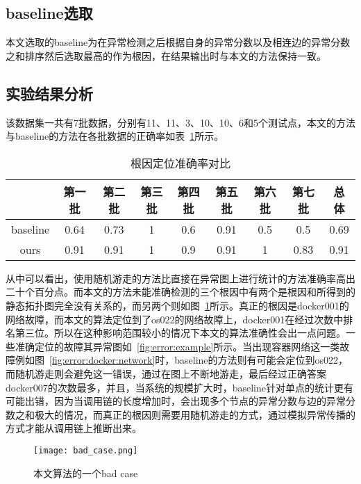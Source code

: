 \subsection{baseline选取}
本文选取的baseline为在异常检测之后根据自身的异常分数以及相连边的异常分数之和排序然后选取最高的作为根因，在结果输出时与本文的方法保持一致。
\subsection{实验结果分析}
该数据集一共有7批数据，分别有11、11、3、10、10、6和5个测试点，本文的方法与baseline的方法在各批数据的正确率如表~\ref{tab:rca:result}所示。

\begin{table}[htbp]
  \centering
  \begin{tabular}{ccccccccc}
    \toprule
      & 第一批 & 第二批 & 第三批 & 第四批 & 第五批 &第六批 & 第七批& 总体\\
    \midrule
    baseline & 0.64 & 0.73 & 1& 0.6 & 0.91 & 0.5 &0.5  & 0.69\\
    ours &  0.91 & 0.91 & 1 & 0.9 & 0.91 &1 & 0.83 & 0.91\\
    \bottomrule
  \end{tabular}
  \caption{根因定位准确率对比}
  \label{tab:rca:result}
\end{table}

从中可以看出，使用随机游走的方法比直接在异常图上进行统计的方法准确率高出二十个百分点。而本文的方法未能准确检测的三个根因中有两个是根因和所得到的静态拓扑图完全没有关系的，而另两个则如图~\ref{fig:bad:case}所示。真正的根因是docker001的网络故障，而本文的算法定位到了os022的网络故障上，docker001在经过次数中排名第三位。所以在这种影响范围较小的情况下本文的算法准确性会出一点问题。一些准确定位的故障其异常图如~\ref{fig:error:example}所示。当出现容器网络这一类故障例如图~\ref{fig:error:docker:network}时，baseline的方法则有可能会定位到os022，而随机游走则会避免这一错误，通过在图上不断地游走，最后经过正确答案docker007的次数最多，并且，当系统的规模扩大时，baseline针对单点的统计更有可能出错，因为当调用链的长度增加时，会出现多个节点的异常分数与边的异常分数之和极大的情况，而真正的根因则需要用随机游走的方式，通过模拟异常传播的方式才能从调用链上推断出来。
\begin{figure}[htbp]
  \centering
  \texttt{[image: bad\_case.png]}
  \caption{本文算法的一个bad case}
  \label{fig:bad:case}
\end{figure}

